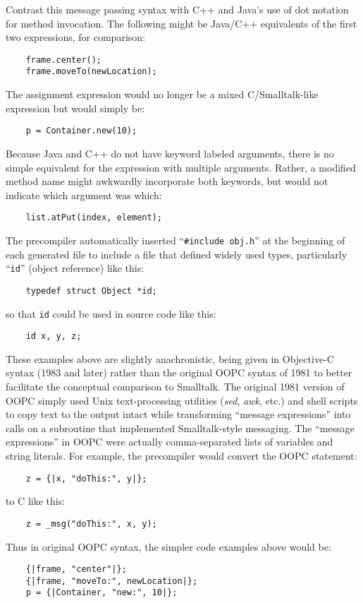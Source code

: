 \documentclass[acmsmall]{acmart}\settopmatter{}
\begin{document}
Contrast this message passing syntax with C++ and Java's use of dot notation for method invocation. The following might be Java/C++ equivalents of the first two expressions, for comparison:
\begin{verbatim}
    frame.center();
    frame.moveTo(newLocation);
\end{verbatim}
The assignment expression would no longer be a mixed C/Smalltalk-like expression but would simply be:
\begin{verbatim}
    p = Container.new(10);
\end{verbatim}
Because Java and C++ do not have keyword labeled arguments, there is no simple equivalent for the expression with multiple arguments. Rather, a modified method name might awkwardly incorporate both keywords, but would not indicate which argument was which:
\begin{verbatim}
    list.atPut(index, element);
\end{verbatim}
The precompiler automatically inserted ``{\small \verb|#include obj.h|}'' at the beginning of each generated file to include a file that defined widely used types, particularly ``\verb$id$'' (object reference) like this:
\begin{verbatim}
    typedef struct Object *id;
\end{verbatim}
so that \verb$id$ could be used in source code like this:
\begin{verbatim}
    id x, y, z;
\end{verbatim}
These examples above are slightly anachronistic, being given in Objective-C syntax (1983 and later) rather than the original OOPC syntax of 1981 to better facilitate the conceptual comparison to Smalltalk.
The original 1981 version of OOPC simply used Unix text-processing utilities (\textit{sed}, \textit{awk}, etc.) and shell scripts to copy text to the output intact while transforming ``message expressions'' into calls on a subroutine that implemented Smalltalk-style messaging. The ``message expressions'' in OOPC were actually comma-separated lists of variables and string literals. For example, the precompiler would convert the OOPC statement:
\begin{verbatim}
    z = {|x, "doThis:", y|};
\end{verbatim}
to C like this:
\begin{verbatim}
    z = _msg("doThis:", x, y);
\end{verbatim}
Thus in original OOPC syntax, the simpler code examples above would be:
\begin{verbatim}
    {|frame, "center"|};
    {|frame, "moveTo:", newLocation|};
    p = {|Container, "new:", 10|};
\end{verbatim}
\end{document}
